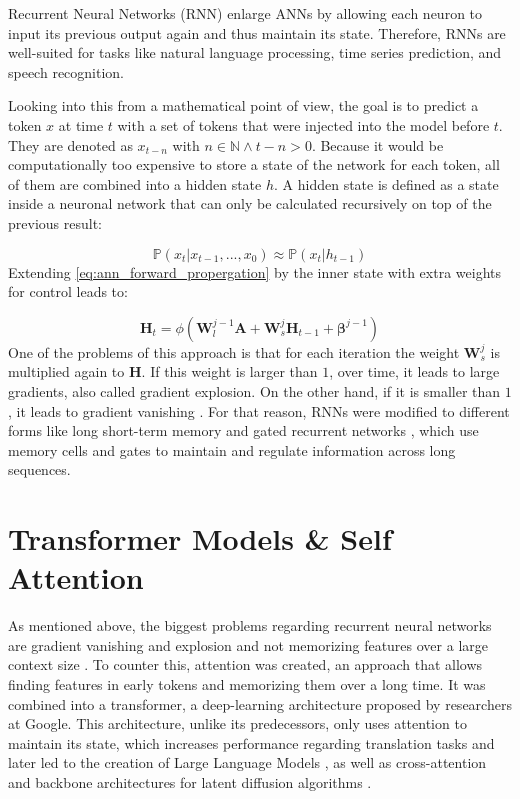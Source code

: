 Recurrent Neural Networks (RNN) \cite{zhang2023dive} enlarge ANNs by allowing each neuron to input its previous output again and thus maintain its state. Therefore, RNNs are well-suited for tasks like natural language processing, time series prediction, and speech recognition.

Looking into this from a mathematical point of view, the goal is to predict a token $x$ at time $t$ with a set of tokens that were injected into the model before $t$. They are denoted as $x_{t - n}$ with $n \in \mathbb{N} \land t - n > 0$. Because it would be computationally too expensive to store a state of the network for each token, all of them are combined into a hidden state $h$. A hidden state is defined as a state inside a neuronal network that can only be calculated recursively on top of the previous result:

\begin{equation}
\mathbb{P}(x_t | x_{t - 1}, ..., x_0) \approx \mathbb{P}(x_t | h_{t-1})
\end{equation}
Extending \autoref{eq:ann_forward_propergation} by the inner state with extra weights for control leads to: 

\begin{equation}
    \boldsymbol{H}_t = \phi{(\boldsymbol{W}_{l}^{j-1}\boldsymbol{A} + \boldsymbol{W}_{s}^{j}\boldsymbol{H}_{t-1} + \boldsymbol{\beta}^{j-1})}
\end{equation}
One of the problems of this approach is that for each iteration the weight $\boldsymbol{W}_{s}^{j}$ is multiplied again to $\boldsymbol{H}$. If this weight is larger than $1$, over time, it leads to large gradients, also called gradient explosion. On the other hand, if it is smaller than $1$, it leads to gradient vanishing \cite{zhang2023dive}. For that reason, RNNs were modified to different forms like long short-term memory \cite{zhang2023dive} \cite{hochreiter1997lstm} and gated recurrent networks \cite{chung2014empirical}, which use memory cells and gates to maintain and regulate information across long sequences.

\section{Transformer Models \& Self Attention}
\label{sec:transformer_models_and_self_attention}
As mentioned above, the biggest problems regarding recurrent neural networks are gradient vanishing and explosion and not memorizing features over a large context size \cite{zhang2023dive}. 
To counter this, attention was created, an approach that allows finding features in early tokens and memorizing them over a long time. It was combined into a transformer, a deep-learning architecture proposed by researchers at Google. This architecture, unlike its predecessors, only uses attention to maintain its state, which increases performance regarding translation tasks and later led to the creation of Large Language Models \cite{brown2020language}, as well as cross-attention and backbone architectures for latent diffusion algorithms
\cite{rombach2022highresolution} \cite{peebles2023scalablediffusionmodelstransformers}. 

